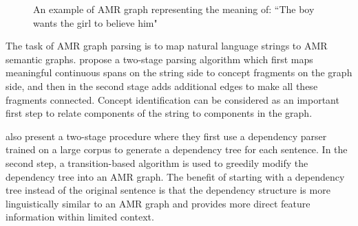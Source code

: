 \begin{figure}
\begin{center}
\caption{An example of AMR graph representing the meaning of: ``The boy wants the girl to believe him"}
\label{fig:amr-example}
\vspace{-1em}
\end{center}
\end{figure}
The task of AMR graph parsing 
is to map natural language strings to AMR semantic graphs.  propose a two-stage parsing
algorithm which first maps meaningful continuous spans on the string side to concept fragments
on the graph side, and then in the second stage adds additional edges to
make all these fragments connected. Concept identification \cite{flanigan2014discriminative,pourdamghanialigning} can be considered as an important first step to
relate components of the string to components in the graph.


 also present a two-stage procedure where they first use a dependency parser
trained on a large corpus to generate a dependency tree for each sentence. In the second step, a transition-based algorithm
is used to greedily modify the dependency tree into an AMR graph. The 
benefit of starting with a dependency tree instead of the original sentence is that the dependency structure is 
more linguistically similar to an AMR graph and provides more direct feature information within limited
context.


